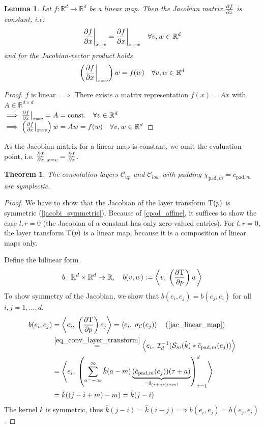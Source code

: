 \documentclass[twoside,a4paper]{article}
\newtheorem{theorem}{Theorem}
\newtheorem{lemma}{Lemma}
\begin{document}
\begin{lemma}\label{jac_linear_map}
	Let $f: \mathbb{R}^d \to \mathbb{R}^d$ be a linear map. Then the Jacobian matrix
	$\frac{\partial f}{\partial x}$ is constant, i.e.
	\begin{equation*}
		\frac{\partial f}{\partial x} \bigg|_{x = v} = \frac{\partial f}{\partial x} \bigg|_{x = w} \quad \forall v,w \in \mathbb{R}^d
	\end{equation*}
	and for the Jacobian-vector product holds
	\begin{equation*}
		\left( \frac{\partial f}{\partial x} \bigg|_{x = v} \right) w = f(w) \quad \forall v,w \in \mathbb{R}^d
	\end{equation*}
\end{lemma}
\begin{proof}
	$f$ is linear $\implies$ There exists a matrix representation $f(x) = Ax$ with
	$A \in \mathbb{R}^{d \times d}$ \\
	$\implies \frac{\partial f}{\partial x} \big|_{x=v} = A = \text{const.} \quad \forall v \in \mathbb{R}^d$
	$\implies \left( \frac{\partial f}{\partial x} \big|_{x=v} \right) w = Aw = f(w) \quad \forall v,w \in \mathbb{R}^d$
\end{proof}
As the Jacobian matrix for a linear map is constant, we omit the evaluation point, i.e.
$\frac{\partial f}{\partial x} \big|_{x=v} = \frac{\partial f}{\partial x}$.

\begin{theorem}\label{thm_conv_const_pad_symplectic}
	The convolution layers $\mathcal{C}_{up}$ and $\mathcal{C}_{low}$
	with padding $\chi_{\text{pad},m} = c_{\text{pad},m}$ are symplectic.
\end{theorem}
\begin{proof}
	We have to show that the Jacobian of the layer transform $\mathrm{T}(p)$
	is symmetric (\cref{jacobi_symmetric}).
	Because of \cref{cpad_affine}, it suffices to show the case $l,r=0$ (the Jacobian
	of a constant has only zero-valued entries). For $l,r=0$, the layer transform 
	$\mathrm{T}(p)$ 
	is a linear map, because it is a composition of linear maps only.

	Define the bilinear form
	\begin{equation}\label{eq_bilinear_proof_conv}
		b : \mathbb{R}^d \times \mathbb{R}^d \to \mathbb{R},
		\quad b(v,w) := \left\langle v,\; \left( \frac{\partial \mathrm{T}}{\partial p} \right) w \right\rangle
	\end{equation}
	To show symmetry of the Jacobian, we show that 
	$b(e_i, e_j) = b(e_j, e_i)$ for all $i,j=1,\dots,d$.
	\begin{align*}
		b(e_i, e_j) &= \ip{e_i}{\lb \jac{\layertf}{p} \rb e_j}
		= \ip{e_i}{\activation_{\mathcal{C}}(e_j)} \quad \text{(\cref{jac_linear_map})} \\
		&\stackrel{\cref{eq_conv_layer_transform}}{=} \ip{e_i}{\mathcal{I}_{d}^{-1} (
			\mathcal{S}_{m}(\hat{k}) * \hat{c}_{\text{pad},m}(e_j)
		)} \\
		&= \ip{e_i}{
			\lb \sum_{a=-\infty}^{\infty} 
				\hat{k}(a-m)
				\underbrace{(\hat{c}_{\text{pad},m}(e_j))(\tau+a)}_{
					= \delta_{(\tau+a) (j+m)}
				}
			\rb_{\tau=1}^d
		} \\
		&= \hat{k}((j-i+m)-m) = \hat{k}(j-i)
	\end{align*}
	The kernel $k$ is symmetric, thus $\hat{k}(j-i) = \hat{k}(i-j) \implies b(e_i, e_j) = b(e_j,e_i)$.
\end{proof}
\end{document}
